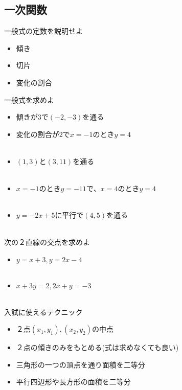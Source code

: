 \documentclass[10pt]{jsarticle}
\begin{document}
\subsection{一次関数}
\begin{itembox}[l]{一般式の定数を説明せよ}
	\begin{multicols}{3}
		\begin{itemize}
			\item 傾き
			\item 切片
			\item 変化の割合
		\end{itemize}
	\end{multicols}
\end{itembox}

\begin{itembox}[l]{一般式を求めよ}
	\begin{itemize}
		\item 傾きが3で$(-2,-3)$を通る\\
		\item 変化の割合が2で$x=-1のときy=4$\\\\
		\item $(1,3)と(3,11)$を通る\\\\
		\item $x=−1のときy=−11で、x=4のときy=4$\\\\
		\item $y=-2x+5$に平行で$(4,5)$を通る\\\\
	\end{itemize}
\end{itembox}

\begin{itembox}[l]{次の２直線の交点を求めよ}
	\begin{itemize}
		\item $y=x+3, y=2x-4$\\\\
		      \item$ x+3y=2, 2x+y=-3$\\\\
	\end{itemize}
\end{itembox}




\begin{itembox}[l]{入試に使えるテクニック}
	\begin{itemize}
		\item ２点$(x_1,y_1),(x_2,y_2)$の中点\\
		\item ２点の傾きのみをもとめる(式は求めなくても良い)\\
		\item 三角形の一つの頂点を通り面積を二等分\\
		\item 平行四辺形や長方形の面積を二等分\\
	\end{itemize}
\end{itembox}
\end{document}
